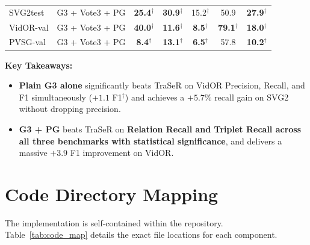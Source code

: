 \documentclass[11pt,a4paper]{article}
\newcommand{\sig}{$^{\dagger}$}
\begin{document}
\begin{table}[H]
\begin{tabular}{llccccc}
SVG2test           & G3 + Vote3 + PG           & \textbf{25.4}\sig & \textbf{30.9}\sig & 15.2\sig & 50.9 & \textbf{27.9}\sig \\
VidOR-val          & G3 + Vote3 + PG           & \textbf{40.0}\sig & \textbf{11.6}\sig & \textbf{8.5}\sig & \textbf{79.1}\sig & \textbf{18.0}\sig \\
PVSG-val           & G3 + Vote3 + PG           & \textbf{8.4}\sig  & \textbf{13.1}\sig & \textbf{6.5}\sig & 57.8 & \textbf{10.2}\sig \\
\bottomrule
\end{tabular}
\end{table}

\textbf{Key Takeaways:}
\begin{itemize}
    \item \textbf{Plain G3 alone} significantly beats TraSeR on VidOR Precision, Recall, and F1 simultaneously ($+1.1$ F1$^{\dagger}$) and achieves a $+5.7\%$ recall gain on SVG2 without dropping precision.
    \item \textbf{G3 + PG} beats TraSeR on \textbf{Relation Recall and Triplet Recall across all three benchmarks with statistical significance}, and delivers a massive $+3.9$ F1 improvement on VidOR.
\end{itemize}

\section{Code Directory Mapping}
The implementation is self-contained within the repository. Table~\ref{tab:code_map} details the exact file locations for each component.
\end{document}
